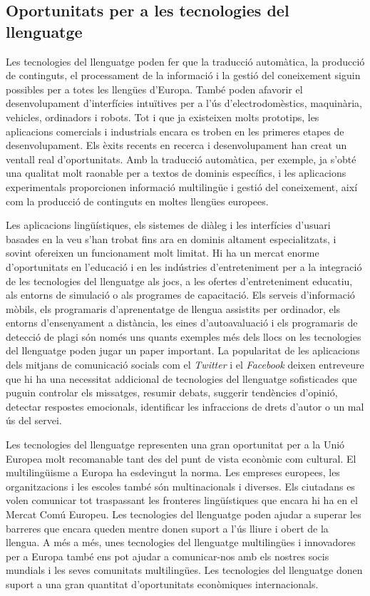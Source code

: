\begin{multicols}{2}
\subsection{Oportunitats per a les tecnologies del llenguatge}

Les tecnologies del llenguatge poden fer que la traducció automàtica, la producció de continguts, el processament de la informació i la gestió del coneixement siguin possibles per a totes les llengües d’Europa. També poden afavorir el desenvolupament d’interfícies intuïtives  per a l'ús d'electrodomèstics, maquinària, vehicles, ordinadors i robots. Tot i que ja existeixen molts prototips, les aplicacions comercials i industrials encara es troben en les primeres etapes de desenvolupament. Els èxits recents en recerca i desenvolupament han creat un ventall real d’oportunitats. Amb la traducció automàtica, per exemple, ja s’obté una qualitat molt raonable per a textos de dominis específics, i les aplicacions experimentals proporcionen informació multilingüe i gestió del coneixement, així com la producció de continguts en moltes llengües europees.

Les aplicacions lingüístiques, els sistemes de diàleg i les interfícies d’usuari basades en la veu s’han trobat fins ara en dominis altament especialitzats, i sovint ofereixen un funcionament molt limitat. Hi ha un mercat enorme d’oportunitats en l’educació i en les indústries d’entre\-te\-ni\-ment per a la integració de les tecnologies del llenguatge als jocs, a les ofertes d'entre\-te\-ni\-ment educatiu, als entorns de simulació o als programes de capacitació. Els serveis d’informació mòbils, els programaris d’aprenentatge de llengua assistits per ordinador, els entorns d’ensenyament a distància, les eines d’autoavaluació i els programaris de detecció de plagi són només uns quants exemples més dels llocs on les tecnologies del llenguatge poden jugar un paper important. La popularitat de les aplicacions dels mitjans de comunicació socials com el \textit{Twitter} i el \textit{Facebook} deixen entreveure que hi ha una necessitat addicional de tecnologies del llenguatge sofisticades que puguin controlar els missatges, resumir debats, suggerir tendències d’opinió, detectar respostes emocionals, identificar les infraccions de drets d’autor o un mal ús del servei. 

Les tecnologies del llenguatge representen una gran oportunitat per a la Unió Europea molt recomanable tant des del punt de vista econòmic com cultural.  El multilingüisme a Europa ha esdevingut la norma.  Les empreses europees, les organitzacions i les escoles també són multinacionals i diverses. Els ciutadans es volen comunicar tot traspassant les fronteres lingüístiques que encara hi ha en el Mercat Comú Europeu. Les tecnologies del llenguatge poden ajudar a superar les barreres que encara queden mentre donen suport a l’ús lliure i obert de la llengua. A més a més, unes tecnologies del llenguatge multilingües i innovadores per a Europa també ens pot ajudar a comunicar-nos amb els nostres socis mundials i les seves comunitats multilingües. Les tecnologies del llenguatge donen suport a una gran quantitat d’oportunitats econòmiques internacionals.


\end{multicols}

